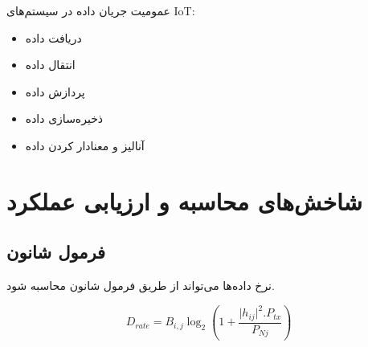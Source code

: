 \documentclass[a4paper]{article}
\begin{document}
عمومیت جریان داده در سیستم‌های IoT:

\begin{itemize}
    \item دریافت داده
    \item انتقال داده
    \item پردازش داده
    \item ذخیره‌سازی داده
    \item آنالیز و معنادار کردن داده
\end{itemize}

\section{شاخش‌های محاسبه و ارزیابی عملکرد}

\begin{table}[H]
    \centering
    \caption{تعریف ثابت‌های مورد استفاده در فرمول‌ها}
    \label{table:staticAndDynamicComparison}
\end{table}

\subsection{فرمول شانون}

نرخ داده‌ها می‌تواند از طریق فرمول شانون محاسبه شود.

\begin{equation}
    D_{rate} = B_{i,j} \log_{2} (1 + \frac{\lvert h_{ij} \rvert ^{2} . P_{tx}}{P_{Nj}}) 
\end{equation}
\end{document}
